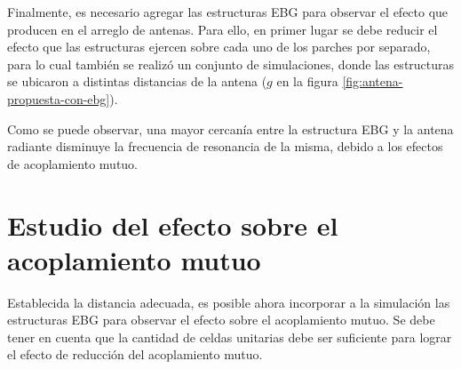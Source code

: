 Finalmente, es necesario agregar las estructuras EBG para observar el efecto que producen en el arreglo de antenas. Para ello, en primer lugar se debe reducir el efecto que las estructuras ejercen sobre cada uno de los parches por separado, para lo cual también se realizó un conjunto de simulaciones, donde las estructuras se ubicaron a distintas distancias de la antena ($g$ en la figura \ref{fig:antena-propuesta-con-ebg}).

Como se puede observar, una mayor cercanía entre la estructura EBG y la antena radiante disminuye la frecuencia de resonancia de la misma, debido a los efectos de acoplamiento mutuo.

\section{Estudio del efecto sobre el acoplamiento mutuo}
\label{sec_estudio_acoplam_mutuo}
Establecida la distancia adecuada, es posible ahora incorporar a la simulación las estructuras EBG para observar el efecto sobre el acoplamiento mutuo. Se debe tener en cuenta que la cantidad de celdas unitarias debe ser suficiente para lograr el efecto de reducción del acoplamiento mutuo.




